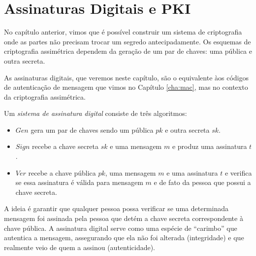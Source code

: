 \chapter{Assinaturas Digitais e PKI}
\label{cha:assinaturas-digitais}

No capítulo anterior, vimos que é possível construir um sistema de criptografia onde as partes não precisam trocar um segredo antecipadamente.
Os esquemas de criptografia assimétrica dependem da geração de um par de chaves: uma pública e outra secreta.

As assinaturas digitais, que veremos neste capítulo, são o equivalente àos códigos de autenticação de mensagem que vimos no Capítulo \ref{cha:mac}, mas no contexto da criptografia assimétrica.

\begin{center}
\end{center}

Um {\em sistema de assinatura digital} consiste de três algoritmos:
\begin{itemize}
\item $Gen$ gera um par de chaves sendo um pública $pk$ e outra secreta $sk$.
\item $Sign$ recebe a chave secreta $sk$ e uma mensagem $m$ e produz uma assinatura $t$.
\item $Ver$ recebe a chave pública $pk$, uma mensagem $m$ e uma assinatura $t$ e verifica se essa assinatura é válida para mensagem $m$ e de fato da pessoa que possui a chave secreta.
\end{itemize}

A ideia é garantir que qualquer pessoa possa verificar se uma determinada mensagem foi assinada pela pessoa que detém a chave secreta correspondente à chave pública.
A assinatura digital serve como uma espécie de ``carimbo'' que autentica a mensagem, assegurando que ela não foi alterada (integridade) e que realmente veio de quem a assinou (autenticidade).


